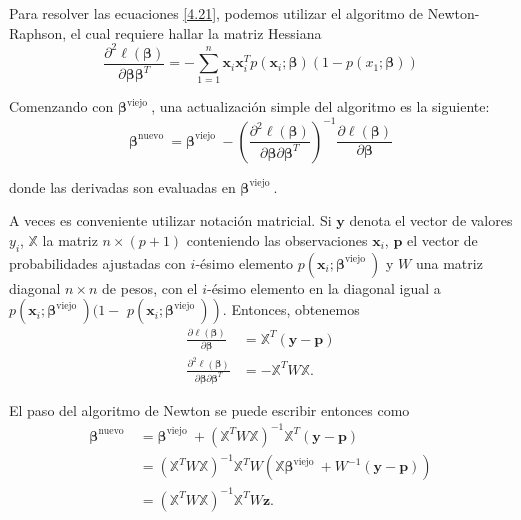 \documentclass{report}
\begin{document}
 Para resolver las ecuaciones \eqref{4.21}, podemos utilizar el algoritmo de Newton-Raphson, el cual requiere hallar la matriz Hessiana 
$$
\frac{\partial^2 \ell(\boldsymbol{\beta})}{\partial \boldsymbol{\beta}  \boldsymbol{\beta}^T}=-\sum_{1=1}^n \mathbf{x}_i \mathbf{x}_i^T p\left(\mathbf{x}_i ; \boldsymbol{\beta}\right)\left(1-p\left(x_1 ; \boldsymbol{\beta}\right)\right) 
$$

 Comenzando con $\boldsymbol{\beta}^{\text {viejo }}$, una actualización simple del algoritmo es la siguiente:
$$
\boldsymbol{\beta}^{\text {nuevo }}=\boldsymbol{\beta}^{\text {viejo }}-\left(\frac{\partial^2 \ell(\boldsymbol{\beta})}{\partial \boldsymbol{\beta} \partial \boldsymbol{\beta}^T}\right)^{-1} \frac{\partial \ell(\boldsymbol{\beta})}{\partial \boldsymbol{\beta}}
$$
 
donde las derivadas son evaluadas en $\boldsymbol{\beta}^{\text {viejo }}$.

 A veces es conveniente utilizar notación matricial. Si $\mathbf{y}$ denota el vector de valores $y_i$, $\mathbb{X}$ la matriz $n \times(p+1)$ conteniendo las observaciones $\mathbf{x}_i$, $\mathbf{p}$ el vector de probabilidades ajustadas  con $i$-ésimo elemento  $p\left(\mathbf{x}_i ; \boldsymbol{\beta}^{\text {viejo }}\right)$ y  $W$ una matriz diagonal  $n \times n$ de pesos, con el $i$-ésimo elemento en la diagonal igual a $p\left(\mathbf{x}_i ; \boldsymbol{\beta}^{\text {viejo }}\right)(1-$ $\left.p\left(\mathbf{x}_i ; \boldsymbol{\beta}^{\text {viejo }}\right)\right)$. Entonces, obtenemos 
$$
\begin{aligned}
	\frac{\partial \ell(\boldsymbol{\beta})}{\partial \boldsymbol{\beta}} & =\mathbb{X}^T(\mathbf{y}-\mathbf{p}) \\
	\frac{\partial^2 \ell(\boldsymbol{\beta})}{\partial \boldsymbol{\beta} \partial \boldsymbol{\beta}^T} & =-\mathbb{X}^T W \mathbb{X}.
\end{aligned}
$$


 El paso del algoritmo de Newton se puede escribir entonces como 
$$
\begin{aligned}
	\boldsymbol{\beta}^{\text {nuevo }} & =\boldsymbol{\beta}^{\text {viejo }}+\left(\mathbb{X}^T W \mathbb{X}\right)^{-1} \mathbb{X}^T(\mathbf{y}-\mathbf{p}) \\
	& =\left(\mathbb{X}^T W \mathbb{X}\right)^{-1} \mathbb{X}^T W\left(\mathbb{X} \boldsymbol{\beta}^{\text {viejo }}+W^{-1}(\mathbf{y}-\mathbf{p})\right) \\
	& =\left(\mathbb{X}^T W \mathbb{X}\right)^{-1} \mathbb{X}^T W \mathbf{z}.
\end{aligned}
$$
\end{document}
